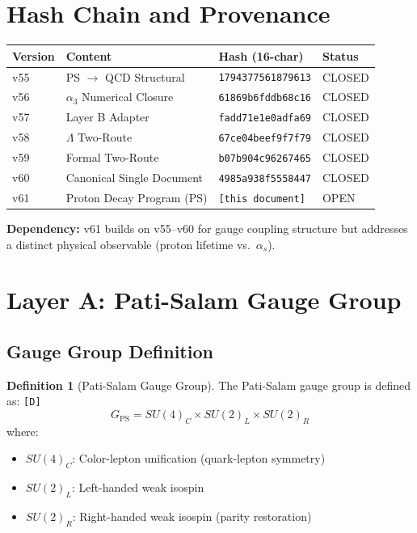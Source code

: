 \documentclass[11pt,a4paper]{article}
\newcommand{\tagD}{\textcolor{green!50!black}{\texttt{[D]}}}
\theoremstyle{definition}
\newtheorem{definition}{Definition}[section]
\begin{document}
\section{Hash Chain and Provenance}
\label{sec:hashchain}

\begin{center}
\begin{tabular}{llll}
\toprule
Version & Content & Hash (16-char) & Status \\
\midrule
v55 & PS $\to$ QCD Structural & \texttt{1794377561879613} & CLOSED \\
v56 & $\alpha_3$ Numerical Closure & \texttt{61869b6fddb68c16} & CLOSED \\
v57 & Layer B Adapter & \texttt{fadd71e1e0adfa69} & CLOSED \\
v58 & $\Lambda$ Two-Route & \texttt{67ce04beef9f7f79} & CLOSED \\
v59 & Formal Two-Route & \texttt{b07b904c96267465} & CLOSED \\
v60 & Canonical Single Document & \texttt{4985a938f5558447} & CLOSED \\
v61 & Proton Decay Program (PS) & \texttt{[this document]} & OPEN \\
\bottomrule
\end{tabular}
\end{center}

\textbf{Dependency:} v61 builds on v55--v60 for gauge coupling structure but
addresses a distinct physical observable (proton lifetime vs.\ $\alpha_s$).

\section{Layer A: Pati-Salam Gauge Group}
\label{sec:ps-group}

\subsection{Gauge Group Definition}
\label{subsec:ps-definition}

\begin{definition}[Pati-Salam Gauge Group]
\label{def:ps-group}
The Pati-Salam gauge group is defined as: \tagD{}
\begin{equation}
\label{eq:ps-group}
\boxed{G_{\text{PS}} = SU(4)_C \times SU(2)_L \times SU(2)_R}
\end{equation}
where:
\begin{itemize}
  \item $SU(4)_C$: Color-lepton unification (quark-lepton symmetry)
  \item $SU(2)_L$: Left-handed weak isospin
  \item $SU(2)_R$: Right-handed weak isospin (parity restoration)
\end{itemize}
\end{definition}
\end{document}
